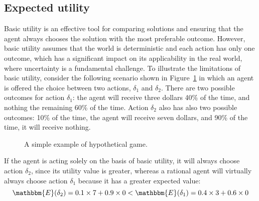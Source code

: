 \subsection{Expected utility}
Basic utility is an effective tool for comparing solutions and ensuring that the agent always chooses the solution with the most preferable outcome. However, basic utility assumes that the world is deterministic and each action has only one outcome, which has a significant impact on its applicability in the real world, where uncertainty is a fundamental challenge.
To illustrate the limitations of basic utility, consider the following scenario shown in Figure~\ref{fig:expected_utility} in which an agent is offered the choice between two actions, $\delta_1$ and $\delta_2$. There are two possible outcomes for action $\delta_1$: the agent will receive three dollars 40\% of the time, and nothing the remaining 60\% of the time. Action $\delta_2$ also has also two possible outcomes: 10\% of the time, the agent will receive seven dollars, and 90\% of the time, it will receive nothing.

\begin{figure}[H]
    \centering
        \caption{A simple example of hypothetical game.}
        \label{fig:expected_utility}
\end{figure}

If the agent is acting solely on the basis of basic utility, it will always choose action $\delta_2$, since its utility value is greater, whereas a rational agent will virtually always choose action $\delta_1$ because it has a greater expected value:
$$ \mathbbm{E}(\delta_2) = 0.1 \times 7 + 0.9 \times 0  < \mathbbm{E}(\delta_1) = 0.4 \times 3 + 0.6 \times 0 $$

